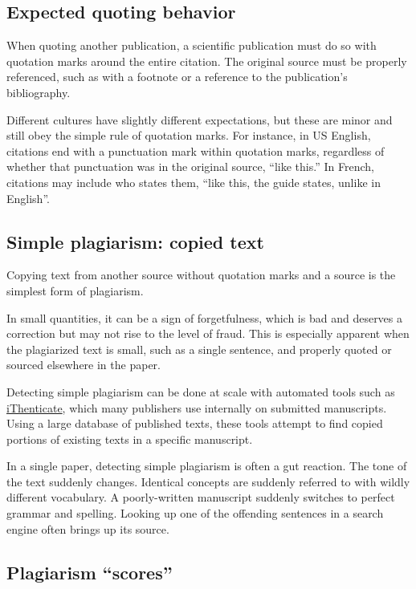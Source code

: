 \documentclass[letterpaper, 12pt]{article}
\begin{document}
\subsection*{Expected quoting behavior}

When quoting another publication, a scientific publication must do so with quotation marks around the entire citation.
The original source must be properly referenced, such as with a footnote or a reference to the publication's bibliography.

Different cultures have slightly different expectations, but these are minor and still obey the simple rule of quotation marks.
For instance, in US English, citations end with a punctuation mark within quotation marks, regardless of whether that punctuation was in the original source, ``like this.''
In French, citations may include who states them, ``like this, the guide states, unlike in English''.

\subsection*{Simple plagiarism: copied text}

Copying text from another source without quotation marks and a source is the simplest form of plagiarism.

In small quantities, it can be a sign of forgetfulness, which is bad and deserves a correction but may not rise to the level of fraud.
This is especially apparent when the plagiarized text is small, such as a single sentence, and properly quoted or sourced elsewhere in the paper.

Detecting simple plagiarism can be done at scale with automated tools such as \href{https://www.turnitin.com/products/ithenticate/}{iThenticate}, which many publishers use internally on submitted manuscripts. 
Using a large database of published texts, these tools attempt to find copied portions of existing texts in a specific manuscript.

In a single paper, detecting simple plagiarism is often a gut reaction.
The tone of the text suddenly changes.
Identical concepts are suddenly referred to with wildly different vocabulary.
A poorly-written manuscript suddenly switches to perfect grammar and spelling. Looking up one of the offending sentences in a search engine often brings up its source.

\subsection*{Plagiarism ``scores''}
\end{document}
